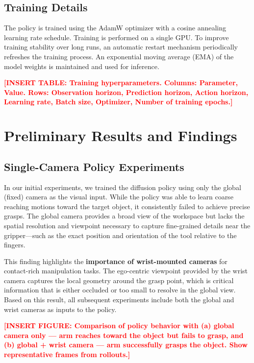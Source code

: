 \documentclass[conference]{IEEEtran}
\newcommand{\placeholder}[1]{\textcolor{red}{\textbf{[#1]}}}
\begin{document}
\subsection{Training Details}

The policy is trained using the AdamW optimizer with a cosine annealing learning rate schedule. Training is performed on a single GPU. To improve training stability over long runs, an automatic restart mechanism periodically refreshes the training process. An exponential moving average (EMA) of the model weights is maintained and used for inference.

\placeholder{INSERT TABLE: Training hyperparameters. Columns: Parameter, Value. Rows: Observation horizon, Prediction horizon, Action horizon, Learning rate, Batch size, Optimizer, Number of training epochs.}

\section{Preliminary Results and Findings}

\subsection{Single-Camera Policy Experiments}

In our initial experiments, we trained the diffusion policy using only the global (fixed) camera as the visual input. While the policy was able to learn coarse reaching motions toward the target object, it consistently failed to achieve precise grasps. The global camera provides a broad view of the workspace but lacks the spatial resolution and viewpoint necessary to capture fine-grained details near the gripper---such as the exact position and orientation of the tool relative to the fingers.

This finding highlights the \textbf{importance of wrist-mounted cameras} for contact-rich manipulation tasks. The ego-centric viewpoint provided by the wrist camera captures the local geometry around the grasp point, which is critical information that is either occluded or too small to resolve in the global view. Based on this result, all subsequent experiments include both the global and wrist cameras as inputs to the policy.

\placeholder{INSERT FIGURE: Comparison of policy behavior with (a) global camera only --- arm reaches toward the object but fails to grasp, and (b) global + wrist camera --- arm successfully grasps the object. Show representative frames from rollouts.}
\end{document}
